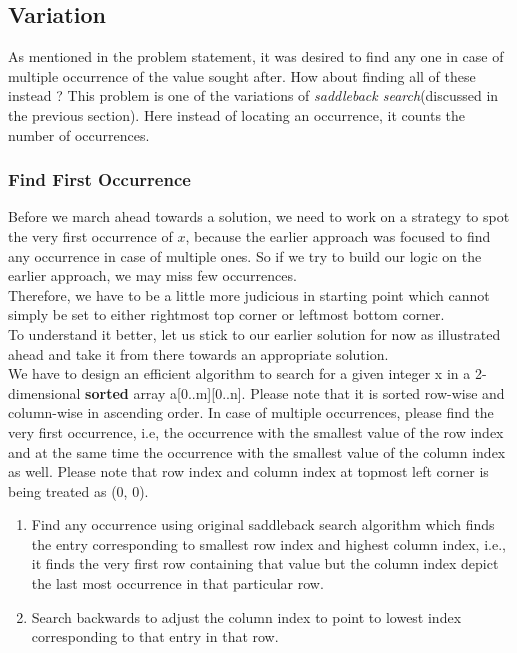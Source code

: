 \subsection{Variation}
As mentioned in the problem statement, it was desired to find any one in case of multiple occurrence of the value sought after. How about finding all of these instead ? This problem is one of the variations of \emph{saddleback search}(discussed in the previous section). Here instead of locating an occurrence, it counts the number of occurrences. 

\subsubsection{Find First Occurrence}
Before we march ahead towards a solution, we need to work on a strategy to spot the very first occurrence of $x$, because the earlier approach was focused to find any occurrence in case of multiple ones. So if we try to build our logic on the earlier approach, we may miss few occurrences. 
\vspace{2mm}\\
Therefore, we have to be a little more judicious in starting point which cannot simply be set to either rightmost top corner or leftmost bottom corner.
\vspace{2mm}\\
To understand it better, let us stick to our earlier solution for now as illustrated ahead and take it from there towards an appropriate solution.\vspace{2mm}\\
We have to design an efficient algorithm to search for a given integer x in a 2-dimensional \textbf{sorted} array a[0..m][0..n]. Please note that it is sorted row-wise and column-wise in ascending order. In case of multiple occurrences, please find the very first occurrence, i.e, the occurrence with the smallest value of the row index and at the same time the occurrence with the smallest value of the column index as well. Please note that row index and column index at topmost left corner is being treated as (0, 0).

\begin{enumerate}
    \item Find any occurrence using original saddleback search algorithm which finds the entry corresponding to smallest row index and highest column index, i.e., it finds the very first row containing that value but the column index depict the last most occurrence in that particular row. 
    \item Search backwards to adjust the column index to point to lowest index corresponding to that entry in that row.
\end{enumerate}

